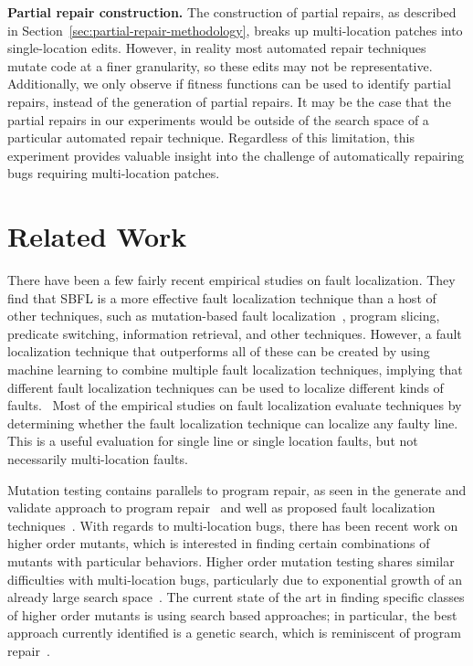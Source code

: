\documentclass[10pt, conference]{IEEEtran}
\begin{document}
\vspace{1ex}
\noindent\textbf{Partial repair construction.}
The construction of partial repairs, as described in
Section~\ref{sec:partial-repair-methodology}, breaks up multi-location patches
into single-location edits. However, in
reality most automated repair techniques mutate code at a finer granularity, so
these edits may not be representative.  Additionally, we only observe if fitness
functions can be used to identify partial repairs,
instead of the generation of partial repairs. It may be the case that the
partial repairs in our experiments would be outside of the search space of a
particular automated repair technique.
Regardless of this limitation, this experiment provides valuable 
insight into the challenge of automatically repairing bugs requiring
multi-location patches.

\section{Related Work}
\label{sec:related}

There have been a few fairly recent empirical studies on fault localization. They find that 
SBFL is a more effective fault localization technique than a host of other techniques, such as 
mutation-based fault localization~\cite{pearson2017evaluating, mut-analysis}, program 
slicing, predicate switching,  information retrieval, and other techniques. 
However, a fault localization 
technique that outperforms all of these can be created by using machine learning to combine 
multiple fault localization techniques, implying that different fault localization techniques can 
be used to localize different kinds of faults.~\cite{zou2019empirical} Most of the empirical 
studies on fault localization evaluate techniques by determining whether the fault localization 
technique can localize any faulty line. This is a useful evaluation for single line or single 
location faults, but not necessarily multi-location faults.

Mutation testing contains parallels to program repair, as seen in the generate and validate 
approach to program repair~\cite{weimer2013leveraging} and well as proposed fault 
localization techniques~\cite{metallaxis,muse,mbfl-survey}. With regards to multi-location 
bugs, there has been recent work on higher order mutants, which is interested in finding 
certain combinations of mutants with particular behaviors. Higher order mutation testing 
shares similar difficulties with multi-location bugs, particularly due to exponential growth of 
an already large search 
space~\cite{long-search-spaces}. The current state of the art in finding specific classes of 
higher order mutants is using search based approaches; in particular, the best approach 
currently identified is a genetic search, which is reminiscent of program repair~\cite{homs, 
genprog}.
\end{document}
